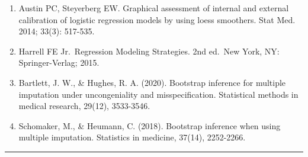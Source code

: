\documentclass[
  letterpaper,
  DIV=11,
  numbers=noendperiod]{scrartcl}
\providecommand{\tightlist}{%
  \setlength{\itemsep}{0pt}\setlength{\parskip}{0pt}}\usepackage{longtable,booktabs,array}
\begin{document}
\begin{enumerate}
\def\labelenumi{\arabic{enumi}.}
\tightlist
\item
  Austin PC, Steyerberg EW. Graphical assessment of internal and
  external calibration of logistic regression models by using loess
  smoothers. Stat Med. 2014; 33(3): 517-535.
\item
  Harrell FE Jr.~Regression Modeling Strategies. 2nd ed.~New York, NY:
  Springer-Verlag; 2015.
\item
  Bartlett, J. W., \& Hughes, R. A. (2020). Bootstrap inference for
  multiple imputation under uncongeniality and misspecification.
  Statistical methods in medical research, 29(12), 3533-3546.
\item
  Schomaker, M., \& Heumann, C. (2018). Bootstrap inference when using
  multiple imputation. Statistics in medicine, 37(14), 2252-2266.
\end{enumerate}

\begin{center}\rule{0.5\linewidth}{0.5pt}\end{center}
\end{document}
